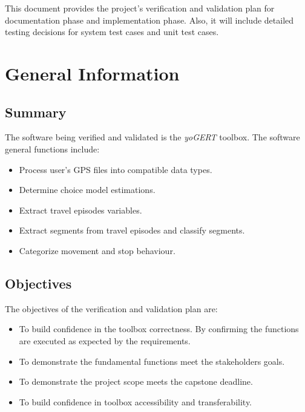 \documentclass[12pt, titlepage]{article}
\begin{document}

This document provides the project's verification and 
validation plan for documentation phase and implementation phase. Also, it will include detailed testing decisions for system test cases and unit test cases.  

\section{General Information}

\subsection{Summary}
The software being verified and validated is the \emph{yoGERT} toolbox. The software general functions include:
\begin{itemize}
    \item Process user's GPS files into compatible data types.
    \item Determine choice model estimations.
    \item Extract travel episodes variables.
    \item Extract segments from travel episodes and classify segments.
    \item Categorize movement and stop behaviour. 
\end{itemize}


\subsection{Objectives}
The objectives of the verification and validation plan are:
\begin{itemize}
    \item To build confidence in the toolbox correctness. By confirming the functions are executed as expected by the requirements. 
    \item To demonstrate the fundamental functions meet the stakeholders goals.
    \item To demonstrate the project scope meets the capstone deadline. 
    \item To build confidence in toolbox accessibility and transferability. 
\end{itemize}
\end{document}
